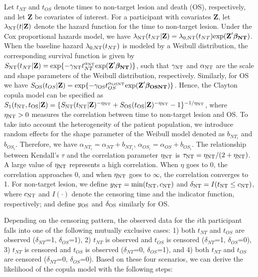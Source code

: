 Let $t_{NT}$ and $t_{OS}$ denote times to non-target lesion and death (OS), respectively, and let $\textbf{Z}$ be covariates of interest.
For a participant with covariates $\textbf{Z}$, let $\lambda_{\rm NT}(t|\textbf{Z})$
denote the hazard function for the time to non-target lesion. Under the Cox
proportional hazards model, we have $\lambda_{\rm NT}(t_{NT}|\textbf{Z})=\lambda_{0, \rm NT}(t_{NT})\mathrm{exp}(\textbf{Z}' \boldsymbol{\beta_{\rm NT}})$.
When the baseline hazard $\lambda_{0, \rm NT}(t_{NT})$ is modeled by a Weibull
distribution, the corresponding survival function is given by
$S_{\rm NT}(t_{NT}|\textbf{Z})=\mathrm{exp}\{-\gamma_{\rm NT} t_{NT}^{\alpha_{\rm NT}}
\mathrm{exp}(\textbf{Z}' \boldsymbol{\beta_{\rm NT}} )\}$, such that $\gamma_{\rm NT}$ and $\alpha_{\rm NT}$ are the scale and shape parameters
of the Weibull distribution, respectively. Similarly, for \ac{OS} we have $S_{\rm OS}(t_{OS}|\textbf{Z})=\mathrm{exp}\{-\gamma_{\rm OS} t_{OS}^{\alpha_{\rm OSNT}}
\mathrm{exp}(\textbf{Z}' \boldsymbol{\beta_{\rm OSNT}} )\}$. Hence, the Clayton copula model can be specified as $S_1(t_{\rm NT},
t_{\rm OS}|\textbf{Z})=\{S_{\rm NT}(t_{\rm NT}|\textbf{Z})^{-\eta_{\rm NT}}
+S_{\rm OS}(t_{\rm OS}|\textbf{Z})^{-\eta_{\rm NT}}-1\}^{-1/\eta_{\rm NT}}$, 
where $\eta_{\rm NT}>0$ measures the correlation between time to non-target lesion and OS. To take into account the heterogeneity of the patient population, we introduce random effects for the shape parameter of the Weibull model denoted as $b_{NT_i}$ and $b_{OS_i}$. Therefore, we have $\alpha_{NT_i}=\alpha_{NT} + b_{NT_i}$, $\alpha_{OS_i}=\alpha_{OS}+b_{OS_i}$. The relationship between Kendall's $\tau$ and the correlation parameter $\eta_{\rm NT}$
is $\tau_{\rm NT} = \eta_{\rm NT}/(2+\eta_{\rm NT})$. A large value of $\eta_{\rm NT}$
represents a high correlation. When $\eta$ goes to 0,
the correlation approaches 0, and when $\eta_{\rm NT}$ goes to $\infty$, the correlation converges to 1. 
For non-target lesion, we define $y_{\rm NT}=\mathrm{min}(t_{\rm NT}, c_{\rm NT})$ and
$\delta_{\rm NT}=I(t_{\rm NT} \le c_{\rm NT})$,
where $c_{\rm NT}$ and $I(\cdot)$ denote the censoring time and the indicator function,
respectively; and define $y_{\rm OS}$ and $\delta_{\rm OS}$ similarly for OS.

Depending on the censoring pattern, the observed data for the $i$th participant falls into one of the following mutually exclusive cases: 1) both $t_{NT}$ and $t_{OS}$ are observed ($\delta_{NT}$=1, $\delta_{OS}$=1), 2) $t_{NT}$ is observed and $t_{OS}$ is censored ($\delta_{NT}$=1, $\delta_{OS}$=0), 3) $t_{NT}$ is censored and $t_{OS}$ is observed ($\delta_{NT}$=0, $\delta_{OS}$=1), and 4) both $t_{NT}$ and $t_{OS}$ are censored ($\delta_{NT}$=0, $\delta_{OS}$=0). Based on these four scenarios, we can derive the likelihood of the copula model with the following steps:

